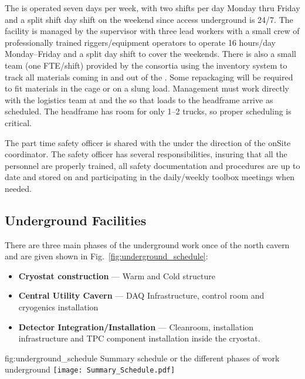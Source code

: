 The  is operated seven days per week, with two shifts per
day Monday thru Friday and a split shift day shift on the weekend
since access underground is 24/7. The facility is managed by the
 supervisor with three lead workers with a small
 crew of professionally trained riggers/equipment operators
to operate 16 hours/day Monday--Friday and a split day shift to cover
the weekends.  There is also a small team (one FTE/shift) provided by
the consortia using the inventory system to track all materials coming
in and out of the . Some repackaging will be required to
fit materials in the cage or on a slung load.  Management must work
directly with the  logistics team at \surf and the
 so that loads to the headframe arrive as scheduled. The
headframe has room for only 1--2 trucks, so proper scheduling is
critical.

The part time safety officer is shared with the  under the
direction of the onSite  coordinator.  The safety officer has
several responsibilities, insuring that all the  personnel are
properly trained, all safety documentation and procedures are up to
date and stored on  and participating in the daily/weekly toolbox
meetings when needed.

\subsection{Underground Facilities}


There are three main phases of the underground work once 
of the north cavern and  are given shown in
Fig.~\ref{fig:underground_schedule}:
\begin{itemize}
 \item {\bf Cryostat construction} --- Warm and Cold structure
 \item {\bf Central Utility Cavern} --- DAQ Infrastructure, control room
   and cryogenics installation
 \item {\bf Detector Integration/Installation} --- Cleanroom, installation
   infrastructure and TPC component installation inside the cryostat.
\end{itemize}
\begin{dunefigure}{fig:underground_schedule}
  {Summary schedule or the different phases of work underground}
  \texttt{[image: Summary\_Schedule.pdf]}
\end{dunefigure}


